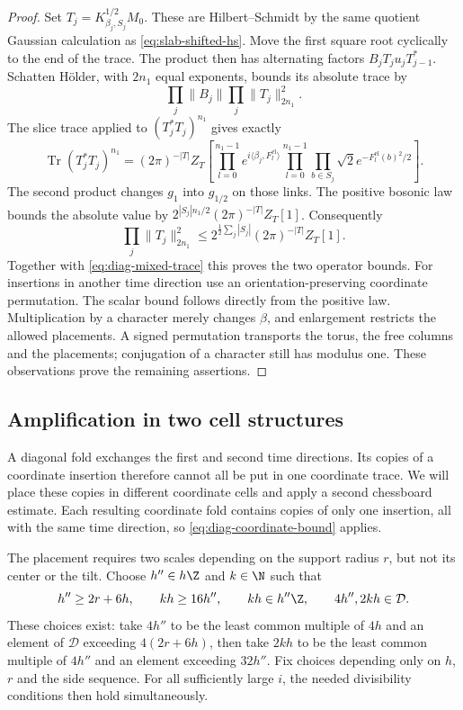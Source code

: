 \begin{proof}
Set $T_j=K_{\beta_j,S_j}^{1/2}M_0$. These are
Hilbert--Schmidt by the same quotient Gaussian calculation as
\eqref{eq:slab-shifted-hs}. Move the first square root cyclically
to the end of the trace. The product then has alternating factors
$B_jT_ju_jT_{j-1}^*$. Schatten H\"older, with $2n_1$ equal
exponents, bounds its absolute trace by
\[
 \prod_j\|B_j\|\prod_j\|T_j\|_{2n_1}^2.
\]
The slice trace applied to $(T_j^*T_j)^{n_1}$ gives exactly
\begin{equation}\label{eq:diag-variance-trace}
 \operatorname{Tr}(T_j^*T_j)^{n_1}
 =(2\pi)^{-|T|}Z_T\left[
    \prod_{l=0}^{n_1-1}e^{i\langle\beta_j,F_l^{\mathrm{el}}\rangle}
    \prod_{l=0}^{n_1-1}\prod_{b\in S_j}
                     \sqrt2e^{-F_l^{\mathrm{el}}(b)^2/2}\right].
\end{equation}
The second product changes $g_1$ into $g_{1/2}$ on those links.
The positive bosonic law bounds the absolute value by
$2^{|S_j|n_1/2}(2\pi)^{-|T|}Z_T[1]$. Consequently
\[
 \prod_j\|T_j\|_{2n_1}^2
 \le 2^{\frac12\sum_j|S_j|}(2\pi)^{-|T|}Z_T[1].
\]
Together with \eqref{eq:diag-mixed-trace} this proves the two
operator bounds. For insertions in another time direction use
an orientation-preserving coordinate permutation. The scalar
bound follows directly from the positive law. Multiplication by
a character merely changes $\beta$, and enlargement restricts
the allowed placements. A signed permutation transports the
torus, the free columns and the placements; conjugation of a
character still has modulus one. These observations prove the
remaining assertions.
\end{proof}

\subsection{Amplification in two cell structures}\label{subsec:diag-amplification}

A diagonal fold exchanges the first and second time directions.
Its copies of a coordinate insertion therefore cannot all be put
in one coordinate trace. We will place these copies in different
coordinate cells and apply a second chessboard estimate. Each
resulting coordinate fold contains copies of only one insertion,
all with the same time direction, so
\eqref{eq:diag-coordinate-bound} applies.

The placement requires two scales depending on the support radius
$r$, but not its center or the tilt. Choose $h''\in h\Z$ and
$k\in\N$ such that
\begin{equation}\label{eq:diag-coarse-widths}
 h''\ge2r+6h,\qquad kh\ge16h'',\qquad
 kh\in h''\Z,\qquad4h'',2kh\in\mathcal D.
\end{equation}
These choices exist: take $4h''$ to be the least common multiple
of $4h$ and an element of $\mathcal D$ exceeding $4(2r+6h)$,
then take $2kh$ to be the least common multiple of $4h''$ and an
element exceeding $32h''$. Fix choices depending only on $h$, $r$
and the side sequence. For all sufficiently large $i$, the needed
divisibility conditions then hold simultaneously.

